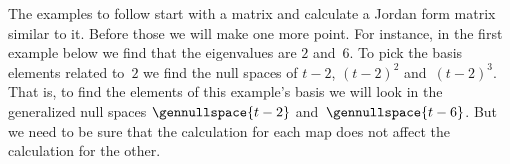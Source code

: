 
The examples to follow start with a matrix and calculate 
a Jordan form matrix similar to it.
Before those we will make one more point.
For instance, in the first example below we find that the eigenvalues are $2$ 
and~$6$. 
To pick the basis elements related to~\( 2\) we find the null spaces of 
$t-2$, \( (t-2)^2 \) and~\( (t-2)^3\). 
That is, to find the elements of this example's basis we will
look in the generalized null spaces $\gennullspace{t-2}$ 
and~$\gennullspace{t-6}$.
But we need to be sure that the calculation for each map does not 
affect the calculation for the other.




